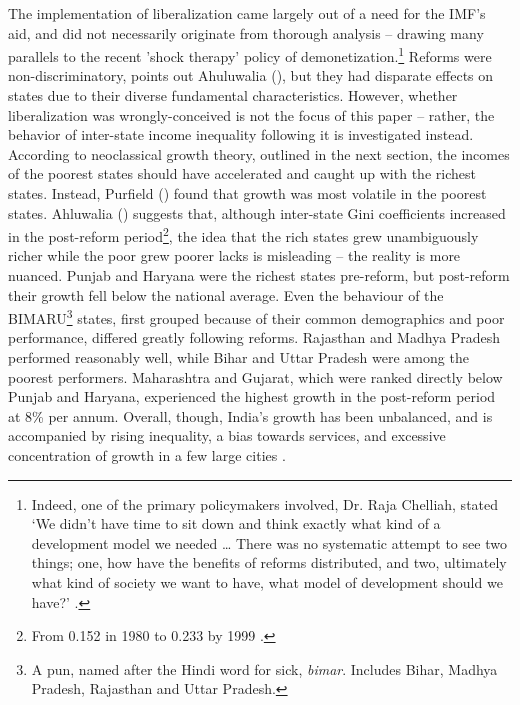\documentclass[a4paper, 11pt]{article}
\begin{document}
	The implementation of liberalization came largely out of a need for the IMF's aid, and did not necessarily originate from thorough analysis -- drawing many parallels to the recent 'shock therapy' policy of demonetization.\footnote{Indeed, one of the primary policymakers involved, Dr. Raja Chelliah, stated ‘We didn’t have time to sit down and think exactly what kind of a development model we needed … There was no systematic attempt to see two things; one, how have the benefits of reforms distributed, and two, ultimately what kind of society we want to have, what model of development should we have?’ \citep{topalova_trade_2005}. }   Reforms were non-discriminatory, points out Ahuluwalia (\citeyear{ahluwalia_state-level_2000}), but they had disparate effects on states due to their diverse fundamental characteristics.  However, whether liberalization was wrongly-conceived is not the focus of this paper -- rather, the behavior of inter-state income inequality following it is investigated instead.  According to neoclassical growth theory, outlined in the next section, the incomes of the poorest states should have accelerated and caught up with the richest states.  Instead, Purfield (\citeyear{purfield_mind_2006}) found that growth was most volatile in the poorest states.  Ahluwalia (\citeyear{ahluwalia_state-level_2000}) suggests that, although inter-state Gini coefficients increased in the post-reform period\footnote{From 0.152 in 1980 to 0.233 by 1999 \citep{ahluwalia_state-level_2000}.}, the idea that the rich states grew unambiguously richer while the poor grew poorer lacks is misleading -- the reality is more nuanced.  Punjab and Haryana were the richest states pre-reform, but post-reform their growth fell below the national average.  Even the behaviour of the BIMARU\footnote{A pun, named after the Hindi word for sick, \textit{bimar}.  Includes Bihar, Madhya Pradesh, Rajasthan and Uttar Pradesh.} states, first grouped because of their common demographics and poor performance, differed greatly following reforms.  Rajasthan and Madhya Pradesh performed reasonably well, while Bihar and Uttar Pradesh were among the poorest performers.  Maharashtra and Gujarat, which were ranked directly below Punjab and Haryana, experienced the highest growth in the post-reform period at 8\% per annum.  Overall, though, India's growth has been unbalanced, and is accompanied by rising inequality, a bias towards services, and excessive concentration of growth in a few large cities \citep{das_remoteness_2013}. \par
\end{document}
